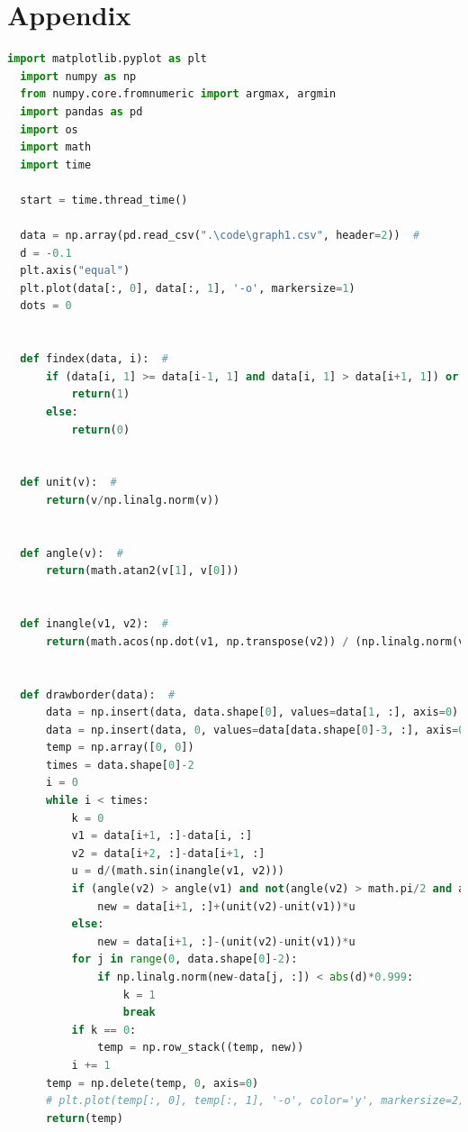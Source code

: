 \documentclass{apmcmthesis}
\begin{document}
\section{Appendix}
\begin{lstlisting}[language=Python,caption={The python Source code of contour parallel hatch}]
  import matplotlib.pyplot as plt
  import numpy as np
  from numpy.core.fromnumeric import argmax, argmin
  import pandas as pd
  import os
  import math
  import time
  
  start = time.thread_time()
  
  data = np.array(pd.read_csv(".\code\graph1.csv", header=2))  # 
  d = -0.1
  plt.axis("equal")
  plt.plot(data[:, 0], data[:, 1], '-o', markersize=1)
  dots = 0
  
  
  def findex(data, i):  # 
      if (data[i, 1] >= data[i-1, 1] and data[i, 1] > data[i+1, 1]) or (data[i, 1] <= data[i-1, 1] and data[i, 1] < data[i+1, 1]):
          return(1)
      else:
          return(0)
  
  
  def unit(v):  # 
      return(v/np.linalg.norm(v))
  
  
  def angle(v):  # 
      return(math.atan2(v[1], v[0]))
  
  
  def inangle(v1, v2):  # 
      return(math.acos(np.dot(v1, np.transpose(v2)) / (np.linalg.norm(v1)*np.linalg.norm(v2))))
  
  
  def drawborder(data):  # 
      data = np.insert(data, data.shape[0], values=data[1, :], axis=0)
      data = np.insert(data, 0, values=data[data.shape[0]-3, :], axis=0)
      temp = np.array([0, 0])
      times = data.shape[0]-2
      i = 0
      while i < times:
          k = 0
          v1 = data[i+1, :]-data[i, :]
          v2 = data[i+2, :]-data[i+1, :]
          u = d/(math.sin(inangle(v1, v2)))
          if (angle(v2) > angle(v1) and not(angle(v2) > math.pi/2 and angle(v1) < -math.pi/2)) or (angle(v2) < -math.pi/2 and angle(v1) > math.pi/2):
              new = data[i+1, :]+(unit(v2)-unit(v1))*u
          else:
              new = data[i+1, :]-(unit(v2)-unit(v1))*u
          for j in range(0, data.shape[0]-2):
              if np.linalg.norm(new-data[j, :]) < abs(d)*0.999:
                  k = 1
                  break
          if k == 0:
              temp = np.row_stack((temp, new))
          i += 1
      temp = np.delete(temp, 0, axis=0)
      # plt.plot(temp[:, 0], temp[:, 1], '-o', color='y', markersize=2)
      return(temp)
  

\end{lstlisting}
\end{document}
